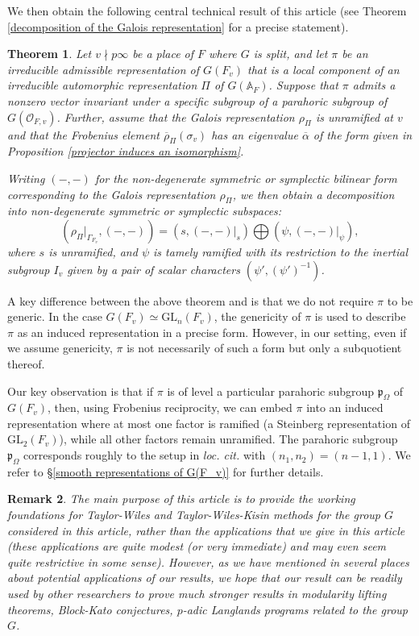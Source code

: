 \documentclass[12pt,oneside,reqno]{amsart}
\theoremstyle{plain}
\newtheorem{theorem}{Theorem}[section]
\newtheorem{remark}[theorem]{Remark}
\begin{document}
	We then obtain the following central technical result of this article (see Theorem \ref{decomposition of the Galois representation} for a precise statement).
	
	\begin{theorem}\label{Theorem 4}
		Let $v\nmid p\infty$ be a place of $F$ where $G$ is split, and let $\pi$ be an irreducible admissible representation of $G(F_v)$ that is a local component of an irreducible automorphic representation $\Pi$ of $G(\mathbb{A}_F)$. Suppose that $\pi$ admits a nonzero vector invariant under a specific subgroup of a parahoric subgroup of $G(\mathcal{O}_{F,v})$. Further, assume that the Galois representation $\rho_{\Pi}$ is unramified at $v$ and that the Frobenius element $\overline{\rho}_{\Pi}(\sigma_v)$ has an eigenvalue $\overline{\alpha}$ of the form given in Proposition \ref{projector induces an isomorphism}. 
		
		Writing $(-,-)$ for the non-degenerate symmetric or symplectic bilinear form corresponding to the Galois representation $\rho_\Pi$, we then obtain a decomposition into non-degenerate symmetric or symplectic subspaces:
		\[
		(\rho_\Pi|_{\Gamma_{F_v}},(-,-))=(s,(-,-)|_s)\bigoplus(\psi,(-,-)|_\psi),
		\]
		where $s$ is unramified, and $\psi$ is tamely ramified with its restriction to the inertial subgroup $I_v$ given by a pair of scalar characters $(\psi',(\psi')^{-1})$.
	\end{theorem}
	
	A key difference between the above theorem and \cite[Proposition 5.12]{Thorne2012} is that we do not require $\pi$ to be generic. In the case $G(F_v) \simeq \mathrm{GL}_n(F_v)$, the genericity of $\pi$ is used to describe $\pi$ as an induced representation in a precise form. However, in our setting, even if we assume genericity, $\pi$ is not necessarily of such a form but only a subquotient thereof.
	
	Our key observation is that if $\pi$ is of level a particular parahoric subgroup $\mathfrak{p}_\Omega$ of $G(F_v)$, then, using Frobenius reciprocity, we can embed $\pi$ into an induced representation where at most one factor is ramified (a Steinberg representation of $\mathrm{GL}_2(F_v)$), while all other factors remain unramified. The parahoric subgroup $\mathfrak{p}_\Omega$ corresponds roughly to the setup in \emph{loc. cit.} with $(n_1,n_2)=(n-1,1)$. We refer to §\ref{smooth representations of G(F_v)} for further details.
	
	
	\begin{remark}
		The \emph{main purpose} of this article is to provide the working foundations for Taylor-Wiles and Taylor-Wiles-Kisin methods for the group $G$ considered in this article, rather than the applications that we give in this article (these applications are quite modest (or very immediate) and may even seem quite restrictive in some sense). However, as we have mentioned in several places about potential applications of our results, we hope that our result can be readily used by other researchers to prove much stronger results in modularity lifting theorems, Block-Kato conjectures, $p$-adic Langlands programs related to the group $G$.
	\end{remark}
	
\end{document}
